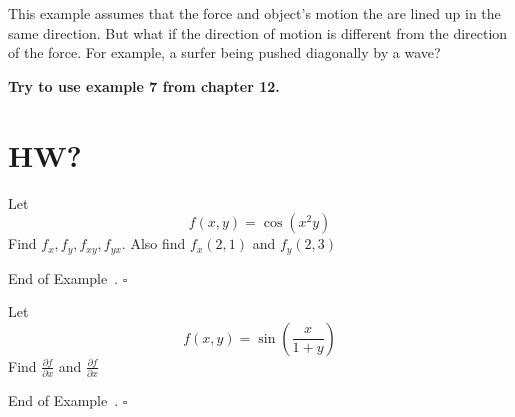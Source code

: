 \documentclass[10pt]{article}
\theoremstyle{definition}
\newtheorem{example}[theorem]{Example}
\renewenvironment{example}
{\begin{oldexample}}
  {\par\smallskip\hfill   End of Example~\theexample. $\square$    \par\end{oldexample}}
\newcommand{\1}[1]{\textbf{1}_{\left[#1\right]}} %
\begin{document}
This example assumes that the force and object's motion the are lined up in the same direction. But what
if the direction of motion is different from the direction of the force. For example, a surfer being
pushed diagonally by a wave?


\textbf{Try to use example 7 from chapter 12.}















\section{HW?}


\begin{example}
  Let
  \begin{equation*}
    f(x,y) = \cos(x^{2}y)
  \end{equation*}
  Find $f_{x},f_{y}, f_{xy}, f_{yx}$. Also find $f_{x}(2,1)$ and $f_{y}(2,3)$
\end{example}


\begin{example}
  Let
  \begin{equation*}
    f(x,y) = \sin\left(\frac{x}{1+y}\right)
  \end{equation*}
  Find $\frac{\partial f}{\partial x}$ and $\frac{\partial f}{\partial x}$
\end{example}
\end{document}
